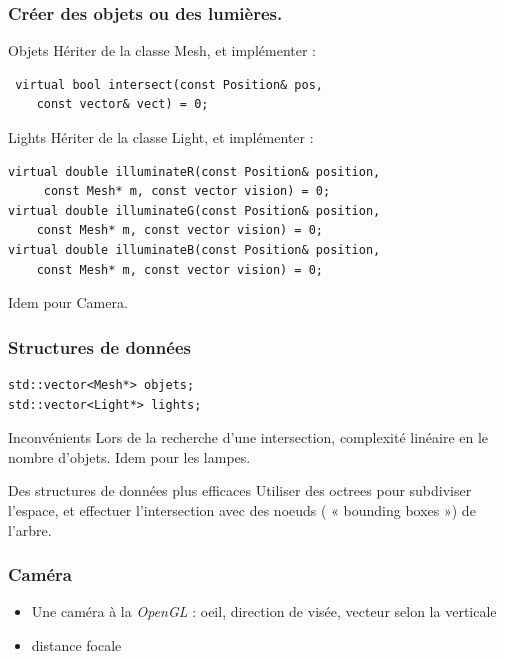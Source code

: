 \begin{frame}[fragile]
\frametitle{Créer des objets ou des lumières.}

\begin{block}{Objets}
Hériter de la classe Mesh, et implémenter :
\begin{verbatim}
 virtual bool intersect(const Position& pos, 
 	const vector& vect) = 0;
\end{verbatim}
\end{block}

\begin{block}{Lights}
Hériter de la classe Light, et implémenter :
\begin{verbatim}
virtual double illuminateR(const Position& position, 
	 const Mesh* m, const vector vision) = 0;
virtual double illuminateG(const Position& position, 
	const Mesh* m, const vector vision) = 0;
virtual double illuminateB(const Position& position, 
	const Mesh* m, const vector vision) = 0;
\end{verbatim}

\end{block}

Idem pour Camera.

\end{frame}

\begin{frame}[fragile]
\frametitle{Structures de données}

\begin{verbatim}
std::vector<Mesh*> objets;
std::vector<Light*> lights;

\end{verbatim}


{
	\begin{alertblock}{Inconvénients}
	Lors de la recherche d'une intersection, complexité linéaire en le nombre d'objets.
	Idem pour les lampes.
	\end{alertblock}
}

{
	\begin{block}{Des structures de données plus efficaces}
	Utiliser des octrees pour subdiviser l'espace, et effectuer l'intersection avec des noeuds ( « bounding boxes ») de l'arbre.
	\end{block}
}


\end{frame}

\begin{frame}
\frametitle{Caméra}

\begin{itemize}
\item Une caméra à la \emph{OpenGL} : oeil, direction de visée, vecteur selon la verticale
\item distance focale
\end{itemize}

\end{frame}



